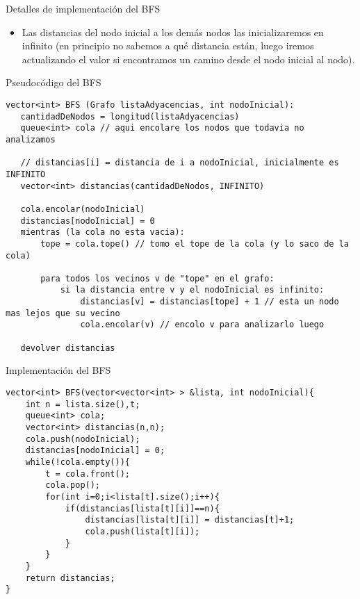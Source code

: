 \documentclass[compress]{beamer}
\begin{document}
\begin{frame}{Detalles de implementación del BFS}
\begin{itemize}
\item Las distancias del nodo inicial a los demás nodos las inicializaremos en infinito (en principio no sabemos a qué distancia están, luego iremos actualizando el valor si encontramos un camino desde el nodo inicial al nodo).
\pause
{}
\pause
{}
\end{itemize}
\end{frame}

\begin{frame}[fragile]{Pseudoc\'odigo del BFS}

\begin{lstlisting}
vector<int> BFS (Grafo listaAdyacencias, int nodoInicial):
   cantidadDeNodos = longitud(listaAdyacencias)
   queue<int> cola // aqui encolare los nodos que todavia no analizamos

   // distancias[i] = distancia de i a nodoInicial, inicialmente es INFINITO
   vector<int> distancias(cantidadDeNodos, INFINITO) 

   cola.encolar(nodoInicial)
   distancias[nodoInicial] = 0
   mientras (la cola no esta vacia):
       tope = cola.tope() // tomo el tope de la cola (y lo saco de la cola)

       para todos los vecinos v de "tope" en el grafo:
           si la distancia entre v y el nodoInicial es infinito:
               distancias[v] = distancias[tope] + 1 // esta un nodo mas lejos que su vecino
               cola.encolar(v) // encolo v para analizarlo luego

   devolver distancias
\end{lstlisting}
\end{frame}


\begin{frame}[fragile]{Implementaci\'on del BFS}
\begin{lstlisting}
vector<int> BFS(vector<vector<int> > &lista, int nodoInicial){
    int n = lista.size(),t;
    queue<int> cola;
    vector<int> distancias(n,n);
    cola.push(nodoInicial);
    distancias[nodoInicial] = 0;
    while(!cola.empty()){
        t = cola.front();
        cola.pop();
        for(int i=0;i<lista[t].size();i++){
            if(distancias[lista[t][i]]==n){
                distancias[lista[t][i]] = distancias[t]+1;
                cola.push(lista[t][i]);
            }
        }
    }
    return distancias;
}
\end{lstlisting}
\end{frame}
\end{document}
